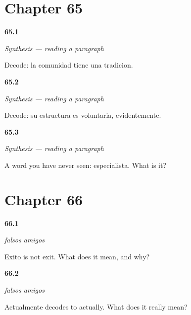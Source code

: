 \section*{Chapter 65}

\noindent\begin{minipage}[t]{\linewidth}
\raggedright
\hypertarget{review-ES-C09-sintesis-ocho-read}{\textbf{65.1}} \emph{Synthesis — reading a paragraph}\par
\small Decode: la comunidad tiene una tradicion.
\end{minipage}\par\medskip

\noindent\begin{minipage}[t]{\linewidth}
\raggedright
\hypertarget{review-ES-C09-sintesis-ocho-mix}{\textbf{65.2}} \emph{Synthesis — reading a paragraph}\par
\small Decode: su estructura es voluntaria, evidentemente.
\end{minipage}\par\medskip

\noindent\begin{minipage}[t]{\linewidth}
\raggedright
\hypertarget{review-ES-C09-sintesis-ocho-new}{\textbf{65.3}} \emph{Synthesis — reading a paragraph}\par
\small A word you have never seen: especialista. What is it?
\end{minipage}\par\medskip

\section*{Chapter 66}

\noindent\begin{minipage}[t]{\linewidth}
\raggedright
\hypertarget{review-ES-C09-falsos-amigos-exito}{\textbf{66.1}} \emph{falsos amigos}\par
\small Exito is not exit. What does it mean, and why?
\end{minipage}\par\medskip

\noindent\begin{minipage}[t]{\linewidth}
\raggedright
\hypertarget{review-ES-C09-falsos-amigos-actual}{\textbf{66.2}} \emph{falsos amigos}\par
\small Actualmente decodes to actually. What does it really mean?
\end{minipage}\par\medskip

